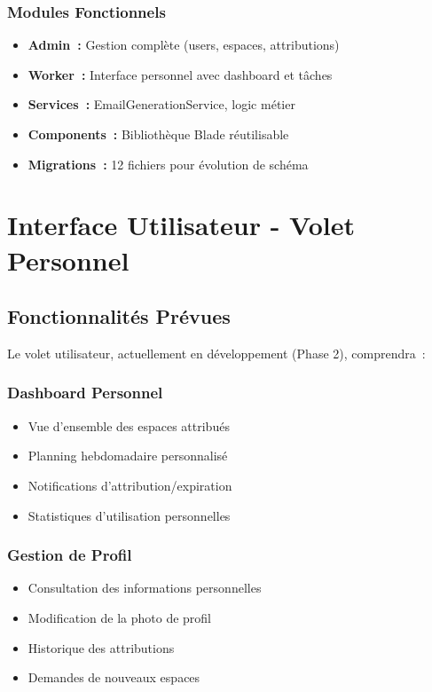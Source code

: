 \documentclass[12pt, a4paper, twoside, openany]{report}
\begin{document}
\subsection{Modules Fonctionnels}
\begin{itemize}
    \item \textbf{Admin~:} Gestion complète (users, espaces, attributions)
    \item \textbf{Worker~:} Interface personnel avec dashboard et tâches
    \item \textbf{Services~:} EmailGenerationService, logic métier
    \item \textbf{Components~:} Bibliothèque Blade réutilisable
    \item \textbf{Migrations~:} 12 fichiers pour évolution de schéma
\end{itemize}

\chapter{Interface Utilisateur - Volet Personnel}

\section{Fonctionnalités Prévues}

Le volet utilisateur, actuellement en développement (Phase 2), comprendra~:

\subsection{Dashboard Personnel}
\begin{itemize}
    \item Vue d'ensemble des espaces attribués
    \item Planning hebdomadaire personnalisé  
    \item Notifications d'attribution/expiration
    \item Statistiques d'utilisation personnelles
\end{itemize}

\subsection{Gestion de Profil}
\begin{itemize}
    \item Consultation des informations personnelles
    \item Modification de la photo de profil
    \item Historique des attributions
    \item Demandes de nouveaux espaces
\end{itemize}
\end{document}
